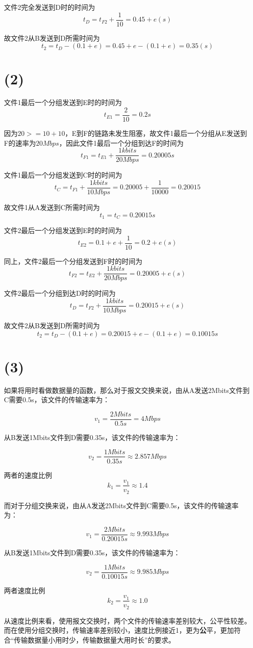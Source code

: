 \documentclass[12pt, a4paper]{article}
\begin{document}
文件2完全发送到D时的时间为$$t_{D}=t_{F2}+\frac{1}{10}=0.45+e (s)$$

故文件2从B发送到D所需时间为$$t_{2}=t_{D}-(0.1+e)=0.45+e-(0.1+e)=0.35 (s)$$

\section{(2)}

文件1最后一个分组发送到E时的时间为$$t_{E1}=\frac{2}{10}=0.2s$$

因为$20>=10+10$，E到F的链路未发生阻塞，故文件1最后一个分组从E发送到F的速率为$20Mbps$，因此文件1最后一个分组到达F的时间为$$t_{F1}=t_{E1}+\frac{1kbits}{20Mbps}=0.20005s$$

文件1最后一个分组发送到C时的时间为$$t_{C}=t_{F1}+\frac{1kbits}{10Mbps}=0.20005+\frac{1}{10000}=0.20015$$

故文件1从A发送到C所需时间为$$t_1=t_C=0.20015s$$

文件2最后一个分组发送到E时的时间为$$t_{E2}=0.1+e+\frac{1}{10}=0.2+e (s)$$

同上，文件2最后一个分组发送到F时的时间为$$t_{F2}=t_{E2}+\frac{1kbits}{20Mbps}=0.20005+e(s)$$

文件2最后一个分组到达D时的时间为$$t_{D}=t_{F2}+\frac{1kbits}{10Mbps}=0.20015+e(s)$$

故文件2从B发送到D所需时间为$$t_2=t_D-(0.1+e)=0.20015+e - (0.1+e) = 0.10015 s$$


\section{(3)}

如果将用时看做数据量的函数，那么对于报文交换来说，由从A发送2Mbits文件到C需要0.5s，该文件的传输速率为：

$$v_1=\frac{2Mbits}{0.5s}=4Mbps$$

从B发送1Mbits文件到D需要0.35s，该文件的传输速率为：

$$v_2=\frac{1Mbits}{0.35s}\approx 2.857Mbps$$

两者的速度比例$$k_1=\frac{v_1}{v_2}\approx 1.4$$

而对于分组交换来说，由从A发送2Mbits文件到C需要0.5s，该文件的传输速率为：

$$v_1=\frac{2Mbits}{0.20015s}\approx 9.993Mbps$$

从B发送1Mbits文件到D需要0.35s，该文件的传输速率为：

$$v_2=\frac{1Mbits}{0.10015s}\approx 9.985Mbps$$

两者速度比例$$k_2=\frac{v_1}{v_2}\approx 1.0$$

从速度比例来看，使用报文交换时，两个文件的传输速率差别较大，公平性较差。而在使用分组交换时，传输速率差别较小，速度比例接近1，更为{\textbf 公平}，更加符合“传输数据量小用时少，传输数据量大用时长”的要求。

\end{document}
